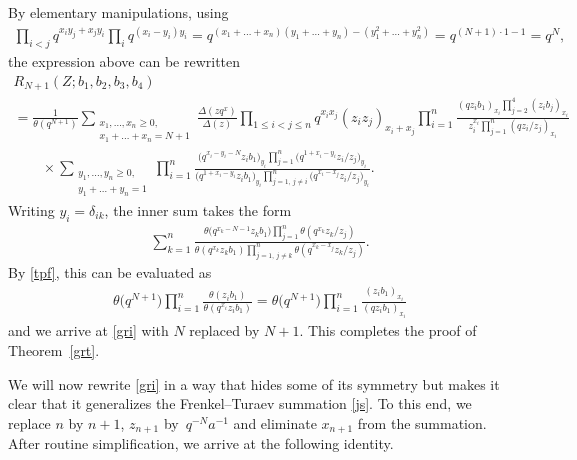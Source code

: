 \documentclass[pdftex]{sigma}
\numberwithin{equation}{section}
\begin{document}
By elementary manipulations, using
\begin{gather*}\prod\limits_{i<j}q^{x_iy_j+x_jy_i}\prod\limits_i q^{(x_i-y_i)y_i}=q^{(x_1+\dots+x_n)(y_1+\dots+y_n)-(y_1^2+\dots+y_n^2)}=q^{(N+1)\cdot 1-1}=q^N, \end{gather*}
the expression above can be rewritten
\begin{gather*}R_{N+1}(Z;b_1,b_2,b_3,b_4)\\
=\frac{1}{\theta(q^{N+1})}\sum_{\substack{x_1,\dots,x_n\geq 0,\\x_1+\dots+x_n=N+1}}
\frac{\Delta(zq^{x})}{\Delta(z)}\prod\limits_{1\leq i<j\leq n}q^{x_ix_j}(z_iz_j)_{x_i+x_j}
\prod\limits_{i=1}^n\frac{(qz_ib_1)_{x_i}\prod\limits_{j=2}^4(z_ib_j)_{x_i}}{z_i^{x_i}\prod\limits_{j=1}^n(qz_i/z_j)_{x_i}}
\\
\qquad{} \times\sum_{\substack{y_1,\dots,y_n\geq 0,\\y_1+\dots+y_n=1}}\prod\limits_{i=1}^n
\frac{\big(q^{x_i-y_i-N}z_ib_1\big)_{y_i}\prod\limits_{j=1}^n\big(q^{1+x_i-y_i}z_i/z_j\big)_{y_i}}{\big(q^{1+x_i-y_i}z_ib_1\big)_{y_i}
\prod\limits_{j=1,\,j\neq i}^n\big(q^{x_i-x_j}z_i/z_j\big)_{y_i}}.
\end{gather*}
Writing $y_i=\delta_{ik}$, the inner sum takes the form
\begin{gather*}\sum_{k=1}^n\frac{\theta\big(q^{x_k-N-1}z_kb_1\big)\prod\limits_{j=1}^n\theta(q^{x_k}z_k/z_j)}{\theta(q^{x_k}z_kb_1)\prod\limits_{j=1,\,j\neq k}^n\theta(q^{x_k-x_j}z_k/z_j)}. \end{gather*}
By \eqref{tpf}, this can be evaluated as{\samepage
\begin{gather*}
\theta\big(q^{N+1}\big)\prod\limits_{i=1}^n\frac{\theta(z_ib_1)}{\theta(q^{x_i}z_ib_1)}=\theta\big(q^{N+1}\big)
\prod\limits_{i=1}^n\frac{(z_ib_1)_{x_i}}{(qz_ib_1)_{x_i}}\end{gather*}
and we arrive at \eqref{gri} with $N$ replaced by $N+1$. This completes the proof of Theorem~\ref{grt}.}

We will now rewrite \eqref{gri} in a way that hides some of its symmetry but makes it clear that it generalizes the Frenkel--Turaev summation \eqref{js}. To this end, we replace $n$ by $n+1$, $z_{n+1}$ by~$q^{-N}a^{-1}$ and eliminate $x_{n+1}$ from the summation. After routine simplif\/ication, we arrive at the following identity.
\end{document}
